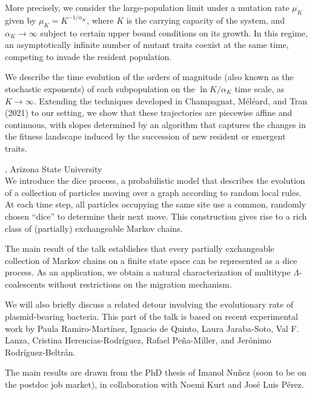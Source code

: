 \documentclass[12pt,a4paper]{article}
\begin{document}
 More precisely, we consider the large-population limit under a mutation rate $\mu_K$ given by $\mu_K = K^{-1/\alpha_K}$, where $K$ is the carrying capacity of the system, and $\alpha_K \to \infty$ subject to certain upper bound conditions on its growth. In this regime, an asymptotically infinite number of mutant traits coexist at the same time, competing to invade the resident population. 


 We describe the time evolution of the orders of magnitude (also known as the stochastic exponents) of each subpopulation on the $\ln K/\alpha_K$ time scale, as $K \to \infty$. Extending the techniques developed in Champagnat, Méléard, and Tran (2021) to our setting, we show that these trajectories are piecewise affine and continuous, with slopes determined by an algorithm that captures the changes in the fitness landscape induced by the succession of new resident or emergent traits. 

\bigskip\bigskip

, Arizona State University \\[2ex] We introduce the dice process, a probabilistic model that describes the evolution of a collection of particles moving over a graph according to random local rules. At each time step, all particles occupying the same site use a common, randomly chosen “dice” to determine their next move. This construction gives rise to a rich class of (partially) exchangeable Markov chains. 

 The main result of the talk establishes that every partially exchangeable collection of Markov chains on a finite state space can be represented as a dice process. As an application, we obtain a natural characterization of multitype $\Lambda$-coalescents without restrictions on the migration mechanism. 

 We will also briefly discuss a related detour involving the evolutionary rate of plasmid-bearing bacteria. This part of the talk is based on recent experimental work by Paula Ramiro-Martínez, Ignacio de Quinto, Laura Jaraba-Soto, Val F. Lanza, Cristina Herencias-Rodríguez, Rafael Peña-Miller, and Jerónimo Rodríguez-Beltrán. 

 The main results are drawn from the PhD thesis of Imanol Nuñez (soon to be on the postdoc job market), in collaboration with Noemi Kurt and José Luis Pérez. 
\end{document}
